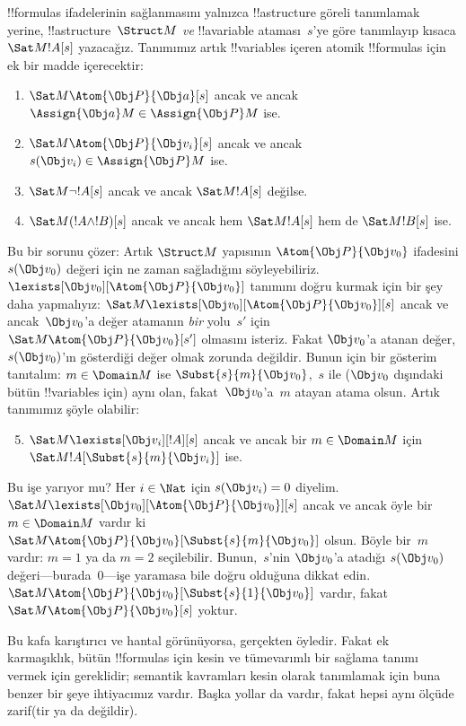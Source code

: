 !!{formula}s ifadelerinin sağlanmasını yalnızca !!a{structure}
göreli tanımlamak yerine, !!a{structure}~$\Struct M$ \emph{ve}
!!a{variable} ataması~$s$'ye göre tanımlayıp kısaca
$\Sat M{!A}[s]$ yazacağız. Tanımımız artık !!{variable}s içeren atomik
!!{formula}s için ek bir madde içerecektir:
\begin{enumerate}
  \item $\Sat M{\Atom{\Obj P}{\Obj a}}[s]$ ancak ve ancak
  $\Assign{\Obj a}M\in\Assign{\Obj P}M$ ise.
  \item $\Sat M{\Atom{\Obj P}{\Obj v_i}}[s]$ ancak ve ancak
  $s(\Obj v_i)\in\Assign{\Obj P}M$ ise.
  \item $\Sat M{\lnot !A}[s]$ ancak ve ancak $\Sat M{!A}[s]$ değilse.
  \item $\Sat M{(!A\land !B)}[s]$ ancak ve ancak hem
  $\Sat M{!A}[s]$ hem de $\Sat M{!B}[s]$ ise.
\end{enumerate}
Bu bir sorunu çözer: Artık $\Struct M$ yapısının
$\Atom{\Obj P}{\Obj v_0}$ ifadesini $s(\Obj v_0)$ değeri için ne zaman
sağladığını söyleyebiliriz. $\lexists[\Obj v_0][\Atom{\Obj P}{\Obj
v_0}]$ tanımını doğru kurmak için bir şey daha yapmalıyız:
$\Sat M{\lexists[\Obj v_0][\Atom{\Obj P}{\Obj v_0}]}[s]$ ancak ve
ancak~$\Obj v_0$'a değer atamanın \emph{bir} yolu~$s'$ için
$\Sat M{\Atom{\Obj P}{\Obj v_0}}[s']$ olmasını isteriz. Fakat
$\Obj v_0$'a atanan değer, $s(\Obj v_0)$'ın gösterdiği değer olmak
zorunda değildir. Bunun için bir gösterim tanıtalım: $m\in\Domain M$
ise $\Subst{s}{m}{\Obj v_0}$,~$s$ ile ($\Obj v_0$ dışındaki bütün
!!{variable}s için) aynı olan, fakat~$\Obj v_0$'a~$m$ atayan atama
olsun. Artık tanımımız şöyle olabilir:
\begin{enumerate}\setcounter{enumi}{4}
  \item $\Sat M{\lexists[\Obj v_i][!A]}[s]$ ancak ve ancak bir
  $m\in\Domain M$ için $\Sat M{!A}[\Subst{s}{m}{\Obj v_i}]$ ise.
\end{enumerate}
Bu işe yarıyor mu? Her $i\in\Nat$ için $s(\Obj v_i)=0$ diyelim.
$\Sat M{\lexists[\Obj v_0][\Atom{\Obj P}{\Obj v_0}]}[s]$ ancak ve
ancak öyle bir $m\in\Domain M$ vardır ki
$\Sat M{\Atom{\Obj P}{\Obj v_0}}[\Subst{s}{m}{\Obj v_0}]$ olsun.
Böyle bir~$m$ vardır: $m=1$ ya da $m=2$ seçilebilir. Bunun,~$s$'nin
$\Obj v_0$'a atadığı $s(\Obj v_0)$ değeri---burada~$0$---işe yaramasa
bile doğru olduğuna dikkat edin.
$\Sat M{\Atom{\Obj P}{\Obj v_0}}[\Subst{s}{1}{\Obj v_0}]$ vardır,
fakat $\Sat M{\Atom{\Obj P}{\Obj v_0}}[s]$ yoktur.

Bu kafa karıştırıcı ve hantal görünüyorsa, gerçekten öyledir. Fakat ek
karmaşıklık, bütün !!{formula}s için kesin ve tümevarımlı bir sağlama
tanımı vermek için gereklidir; semantik kavramları kesin olarak
tanımlamak için buna benzer bir şeye ihtiyacımız vardır. Başka yollar
da vardır, fakat hepsi aynı ölçüde zarif(tir ya da değildir).

